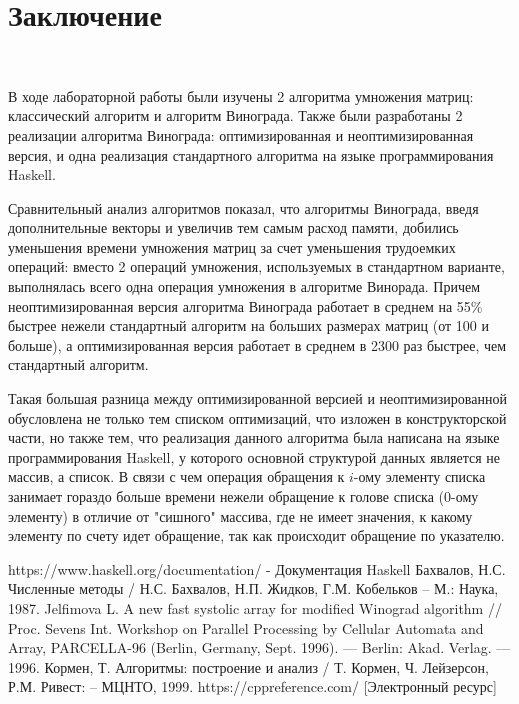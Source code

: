 \documentclass[12pt]{report}
\begin{document}
	\chapter*{Заключение}
	
	~\
	
	В ходе лабораторной работы были изучены 2 алгоритма умножения матриц: классический алгоритм и алгоритм Винограда. Также были разработаны 2 реализации алгоритма Винограда: оптимизированная и неоптимизированная версия, и одна реализация стандартного алгоритма на языке программирования Haskell. 
	
	Сравнительный анализ алгоритмов показал, что алгоритмы Винограда, введя дополнительные векторы и увеличив тем самым расход памяти, добились уменьшения времени умножения матриц за счет уменьшения трудоемких операций:
	вместо 2 операций умножения, используемых в стандартном варианте, выполнялась всего одна операция умножения в алгоритме Винорада. Причем неоптимизированная версия алгоритма Винограда работает в среднем на 55\% быстрее нежели стандартный алгоритм на больших размерах матриц (от 100 и больше), а оптимизированная версия работает в среднем в 2300 раз быстрее, чем стандартный алгоритм.
	
	Такая большая разница между оптимизированной версией и неоптимизированной обусловлена не только тем списком оптимизаций, что изложен в конструкторской части, но также тем, что реализация данного алгоритма была написана на языке программирования Haskell, у которого основной структурой данных является не массив, а список. В связи с чем операция обращения к $i$-ому элементу списка занимает гораздо больше времени нежели обращение к голове списка (0-ому элементу) в отличие от "сишного" массива, где не имеет значения, к какому элементу по счету идет обращение, так как происходит обращение по указателю.
	\newpage
	
	\begin{thebibliography}{}
		  https://www.haskell.org/documentation/ - Документация Haskell
		 Бахвалов, Н.С. Численные методы / Н.С. Бахвалов, Н.П. Жидков, Г.М. Кобельков – М.: Наука, 1987.
		 Jelfimova L. A new fast systolic array for modified Winograd algorithm // Proc. Sevens Int. Workshop on Parallel Processing by Cellular Automata and Array, PARCELLA-96 (Berlin, Germany, Sept. 1996). — Berlin: Akad. Verlag. — 1996.
		 Кормен, Т. Алгоритмы: построение и анализ / Т. Кормен, Ч. Лейзерсон, Р.М. Ривест: – МЦНТО, 1999.
		 https://cppreference.com/ [Электронный ресурс]
	\end{thebibliography}
	
	
\end{document}
